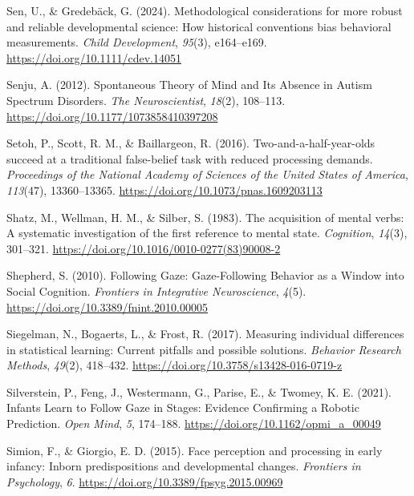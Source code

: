 \documentclass[
]{scrbook}
\newlength{\cslhangindent}
\newenvironment{CSLReferences}[2] %
 {\begin{list}{}{%
  \setlength{\itemindent}{0pt}
  \setlength{\leftmargin}{0pt}
  \setlength{\parsep}{0pt}
  \ifodd #1
   \setlength{\leftmargin}{\cslhangindent}
   \setlength{\itemindent}{-1\cslhangindent}
  \fi
  \setlength{\itemsep}{#2\baselineskip}}}
 {\end{list}}
\begin{document}
\begin{CSLReferences}{1}{0}
Sen, U., \& Gredebäck, G. (2024). Methodological considerations for more robust and reliable developmental science: {How} historical conventions bias behavioral measurements. \emph{Child Development}, \emph{95}(3), e164--e169. \url{https://doi.org/10.1111/cdev.14051}

Senju, A. (2012). Spontaneous {Theory} of {Mind} and {Its Absence} in {Autism Spectrum Disorders}. \emph{The Neuroscientist}, \emph{18}(2), 108--113. \url{https://doi.org/10.1177/1073858410397208}

Setoh, P., Scott, R. M., \& Baillargeon, R. (2016). Two-and-a-half-year-olds succeed at a traditional false-belief task with reduced processing demands. \emph{Proceedings of the National Academy of Sciences of the United States of America}, \emph{113}(47), 13360--13365. \url{https://doi.org/10.1073/pnas.1609203113}

Shatz, M., Wellman, H. M., \& Silber, S. (1983). The acquisition of mental verbs: {A} systematic investigation of the first reference to mental state. \emph{Cognition}, \emph{14}(3), 301--321. \url{https://doi.org/10.1016/0010-0277(83)90008-2}

Shepherd, S. (2010). Following {Gaze}: {Gaze-Following Behavior} as a {Window} into {Social Cognition}. \emph{Frontiers in Integrative Neuroscience}, \emph{4}(5). \url{https://doi.org/10.3389/fnint.2010.00005}

Siegelman, N., Bogaerts, L., \& Frost, R. (2017). Measuring individual differences in statistical learning: {Current} pitfalls and possible solutions. \emph{Behavior Research Methods}, \emph{49}(2), 418--432. \url{https://doi.org/10.3758/s13428-016-0719-z}

Silverstein, P., Feng, J., Westermann, G., Parise, E., \& Twomey, K. E. (2021). Infants {Learn} to {Follow Gaze} in {Stages}: {Evidence Confirming} a {Robotic Prediction}. \emph{Open Mind}, \emph{5}, 174--188. \url{https://doi.org/10.1162/opmi_a_00049}

Simion, F., \& Giorgio, E. D. (2015). Face perception and processing in early infancy: Inborn predispositions and developmental changes. \emph{Frontiers in Psychology}, \emph{6}. \url{https://doi.org/10.3389/fpsyg.2015.00969}


\end{CSLReferences}
\end{document}
